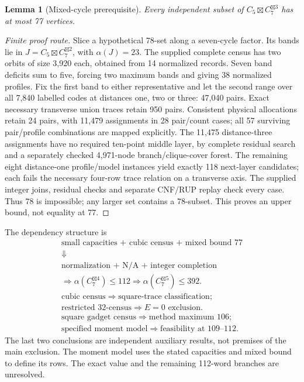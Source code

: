 \documentclass[11pt]{article}
\newtheorem{lemma}[theorem]{Lemma}
\theoremstyle{definition}
\newcommand{\G}[1]{C_7^{\boxtimes #1}}
\begin{document}
\begin{lemma}[Mixed-cycle prerequisite]\label{lem:mixed77}
Every independent subset of $C_5\boxtimes C_7^{\boxtimes3}$ has at
most 77 vertices.
\end{lemma}
\begin{proof}[Finite proof route]
Slice a hypothetical 78-set along a seven-cycle factor. Its bands lie
in $J=C_5\boxtimes C_7^{\boxtimes2}$, with $\alpha(J)=23$.
The supplied complete census has two orbits of size 3,920 each, obtained
from 14 normalized records. Seven band deficits sum to five, forcing
two maximum bands and giving 38 normalized profiles. Fix the first band
to either representative and let the second range over all 7,840 labelled
codes at distances one, two or three: 47,040 pairs. Exact necessary
transverse union traces retain 950 pairs. Consistent physical allocations
retain 24 pairs, with 11,479 assignments in 28 pair/count cases; all
57 surviving pair/profile combinations are mapped explicitly.
The 11,475 distance-three assignments have no required ten-point middle
layer, by complete residual search and a separately checked 4,971-node
branch/clique-cover forest. The remaining eight distance-one profile/model
instances yield exactly 118 next-layer candidates; each fails the necessary
four-row trace relation on a transverse axis. The supplied integer joins,
residual checks and separate CNF/RUP replay check every case. Thus 78 is
impossible; any larger set contains a 78-subset. This proves an upper
bound, not equality at 77.
\end{proof}

The dependency structure is
\[
\begin{gathered}
\text{small capacities + cubic census + mixed bound 77}\\
\Downarrow\\
\text{normalization + N/A + integer completion}\\
\Longrightarrow\alpha(\G4)\leq112
\Longrightarrow\alpha(\G5)\leq392.\\[3pt]
\text{cubic census}\Longrightarrow\text{square-trace classification};\\
\text{restricted 32-census}\Longrightarrow E=0\text{ exclusion}.\\
\text{square gadget census}\Longrightarrow\text{method maximum 106};\\
\text{specified moment model}\Longrightarrow\text{feasibility at 109--112}.
\end{gathered}
\]
The last two conclusions are independent auxiliary results, not premises
of the main exclusion. The moment model uses the stated capacities and
mixed bound to define its rows. The exact value and the remaining
112-word branches are unresolved.
\end{document}
